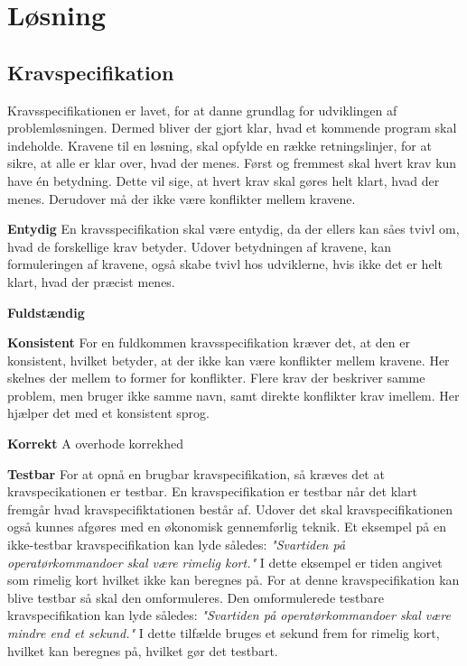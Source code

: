 \chapter{Løsning}\label{ch:losning}

\section{Kravspecifikation}
Kravsspecifikationen er lavet, for at danne grundlag for udviklingen af problemløsningen. Dermed bliver der gjort klar, hvad et kommende program skal indeholde. Kravene til en løsning, skal opfylde en række retningslinjer, for at sikre, at alle er klar over, hvad der menes. Først og fremmest skal hvert krav kun have én betydning. Dette vil sige, at hvert krav skal gøres helt klart, hvad der menes. Derudover må der ikke være konflikter mellem kravene.



\textbf{Entydig}
En kravsspecifikation skal være entydig, da der ellers kan såes tvivl om, hvad de forskellige krav betyder. Udover betydningen af kravene, kan formuleringen af kravene, også skabe tvivl hos udviklerne, hvis ikke det er helt klart, hvad der præcist menes. 

\textbf{Fuldstændig}


\textbf{Konsistent}
For en fuldkommen kravsspecifikation kræver det, at den er konsistent, hvilket betyder, at der ikke kan være konflikter mellem kravene. Her skelnes der mellem to former for konflikter. Flere krav der beskriver samme problem, men bruger ikke samme navn, samt direkte konflikter krav imellem. Her hjælper det med et konsistent sprog.

\textbf{Korrekt}
A overhode korrekhed 

\textbf{Testbar}
For at opnå en brugbar kravspecifikation, så kræves det at kravspecikationen er testbar. En kravspecifikation er testbar når det klart fremgår hvad kravspecifiktationen består af. Udover det skal kravspecifikationen også kunnes afgøres med en økonomisk gennemførlig teknik. Et eksempel på en ikke-testbar kravspecifikation kan lyde således: \textit{"Svartiden på operatørkommandoer skal være rimelig kort."} I dette eksempel er tiden angivet som rimelig kort hvilket ikke kan beregnes på. For at denne kravspecifikation kan blive testbar så skal den omformuleres. Den omformulerede testbare kravspecifikation kan lyde således: \textit{"Svartiden på operatørkommandoer skal være mindre end et sekund."} I dette tilfælde bruges et sekund frem for rimelig kort, hvilket kan beregnes på, hvilket gør det testbart.


